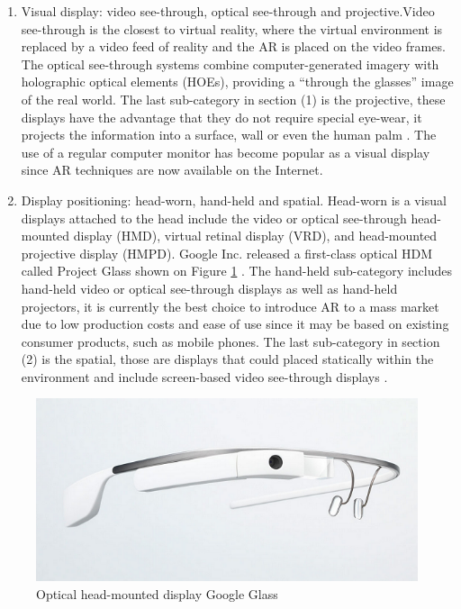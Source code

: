 \begin{enumerate}
  \item Visual display: video see-through, optical see-through and projective.Video see-through is the closest to virtual reality, where the virtual environment is replaced by a video feed of reality and the AR is placed on the video frames. The optical see-through systems combine computer-generated imagery with holographic optical elements (HOEs), providing a ``through the glasses'' image of the real world. The last sub-category in section (1) is the projective, these displays have the advantage that they do not require special eye-wear, it projects the information into a surface, wall or even the human palm \cite{Benford1998}. The use of a regular computer monitor has become popular as a visual display since AR techniques are now available on the Internet.
  \item Display positioning: head-worn, hand-held and spatial. Head-worn is a visual displays attached to the head include the video or optical see-through head-mounted display (HMD), virtual retinal display (VRD), and head-mounted projective display (HMPD). Google Inc. released a first-class optical HDM called Project Glass shown on Figure \ref{figure:google_glass} \cite{Glass2013}. The hand-held sub-category includes hand-held video or optical see-through displays as well as hand-held projectors, it is currently the best choice to introduce AR to a mass market due to low production costs and ease of use since it may be based on existing consumer products, such as mobile phones. The last sub-category in section (2) is the spatial, those are displays that could placed statically within the environment and include screen-based video see-through displays \cite{Benford1998}.
\end{enumerate}

\begin{figure}[!htb]
  \centering
  \includegraphics[width=\linewidth]{chapters/basic_concepts/google_glass.png}
  \caption{Optical head-mounted display Google Glass \cite{Glass2013}}
  \label{figure:google_glass}
\end{figure}

